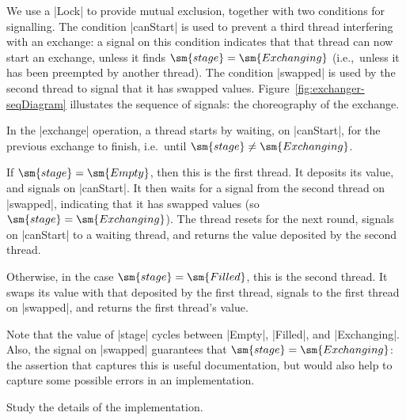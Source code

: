 
We use a |Lock| to provide mutual exclusion, together with two conditions for
signalling.  The condition |canStart| is used to prevent a third thread
interfering with an exchange: a signal on this condition indicates that that
thread can now start an exchange, unless it finds $\sm{stage} =
\sm{Exchanging}$ (i.e.,~unless it has been preempted by another thread).  The
condition |swapped| is used by the second thread to signal that it has swapped
values.  Figure~\ref{fig:exchanger-seqDiagram} illustates the sequence of
signals: the choreography of the exchange.

In the |exchange| operation, a thread starts by waiting, on |canStart|, for
the previous exchange to finish, i.e.~until $\sm{stage} \ne \sm{Exchanging}$. 

If $\sm{stage} = \sm{Empty}$, then this is the first thread.  It deposits its
value, and signals on |canStart|.  It then waits for a signal from the second
thread on |swapped|, indicating that it has swapped values (so $\sm{stage} =
\sm{Exchanging}$).  The thread resets for the next round, signals on
|canStart| to a waiting thread, and returns the value deposited by the second
thread.

Otherwise, in the case $\sm{stage} = \sm{Filled}$, this is the second thread.
It swaps its value with that deposited by the first thread, signals to the
first thread on |swapped|, and returns the first thread's value.

Note that the value of |stage| cycles between |Empty|, |Filled|, and
|Exchanging|.  Also, the signal on |swapped| guarantees that $\sm{stage} =
\sm{Exchanging}$: the assertion that captures this is useful documentation,
but would also help to capture some possible errors in an implementation. 

\begin{instruction}
Study the details of the implementation.
\end{instruction}
